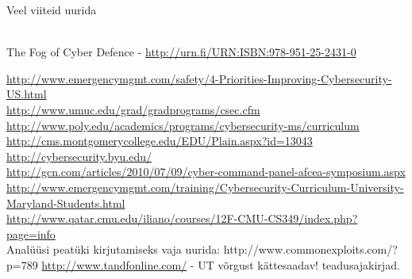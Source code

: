 Veel viiteid uurida 
{\scriptsize
\\

The Fog of Cyber Defence - \url{http://urn.fi/URN:ISBN:978-951-25-2431-0}

\url{http://www.emergencymgmt.com/safety/4-Priorities-Improving-Cybersecurity-US.html}\\
\url{http://www.umuc.edu/grad/gradprograms/csec.cfm}
\\
\url{http://www.poly.edu/academics/programs/cybersecurity-ms/curriculum}\\
\url{http://cms.montgomerycollege.edu/EDU/Plain.aspx?id=13043}\\
\url{http://cybersecurity.byu.edu/}\\
\url{http://gcn.com/articles/2010/07/09/cyber-command-panel-afcea-symposium.aspx}\\
\url{http://www.emergencymgmt.com/training/Cybersecurity-Curriculum-University-Maryland-Students.html}\\
\url{http://www.qatar.cmu.edu/iliano/courses/12F-CMU-CS349/index.php?page=info}\\
{\color{red} Analüüsi peatüki kirjutamiseks vaja uurida:}
http://www.commonexploits.com/?p=789
\url{http://www.tandfonline.com/} - UT võrgust kättesaadav! teadusajakirjad.

}
